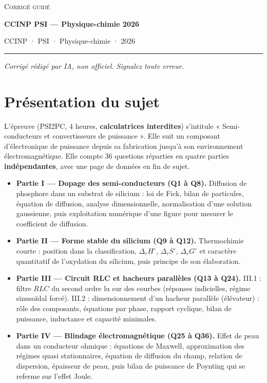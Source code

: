 \documentclass[11pt,a4paper]{article}
\providecommand{\tightlist}{\setlength{\itemsep}{0pt}\setlength{\parskip}{0pt}}
\begin{document}
\thispagestyle{plain}
\begin{center}
  {\small\scshape Corrigé guidé}\par\smallskip
  {\LARGE\bfseries CCINP PSI — Physique-chimie 2026\par}\medskip
  {\large CCINP · PSI · Physique-chimie · 2026\par}
\end{center}
\vspace{2pt}\hrule\vspace{8pt}

\emph{Corrigé rédigé par IA, non officiel. Signalez toute erreur.}

\hypertarget{pruxe9sentation-du-sujet}{%
\section{Présentation du sujet}\label{pruxe9sentation-du-sujet}}

L'épreuve (PSI2PC, 4 heures, \textbf{calculatrices interdites}) s'intitule « Semi-conducteurs et convertisseurs de puissance ». Elle suit un composant d'électronique de puissance depuis sa fabrication jusqu'à son environnement électromagnétique. Elle compte 36 questions réparties en quatre parties \textbf{indépendantes}, avec une page de données en fin de sujet.

\begin{itemize}
\tightlist
\item
  \textbf{Partie I --- Dopage des semi-conducteurs (Q1 à Q8).} Diffusion de phosphore dans un substrat de silicium : loi de Fick, bilan de particules, équation de diffusion, analyse dimensionnelle, normalisation d'une solution gaussienne, puis exploitation numérique d'une figure pour mesurer le coefficient de diffusion.
\item
  \textbf{Partie II --- Forme stable du silicium (Q9 à Q12).} Thermochimie courte : position dans la classification, \(\Delta_rH^\circ\), \(\Delta_rS^\circ\), \(\Delta_rG^\circ\) et caractère quantitatif de l'oxydation du silicium, puis principe de son élaboration.
\item
  \textbf{Partie III --- Circuit RLC et hacheurs parallèles (Q13 à Q24).} III.1 : filtre \(RLC\) du second ordre lu sur des courbes (réponses indicielles, régime sinusoïdal forcé). III.2 : dimensionnement d'un hacheur parallèle (élévateur) : rôle des composants, équations par phase, rapport cyclique, bilan de puissance, inductance et capacité minimales.
\item
  \textbf{Partie IV --- Blindage électromagnétique (Q25 à Q36).} Effet de peau dans un conducteur ohmique : équations de Maxwell, approximation des régimes quasi stationnaires, équation de diffusion du champ, relation de dispersion, épaisseur de peau, puis bilan de puissance de Poynting qui se referme sur l'effet Joule.
\end{itemize}
\end{document}
